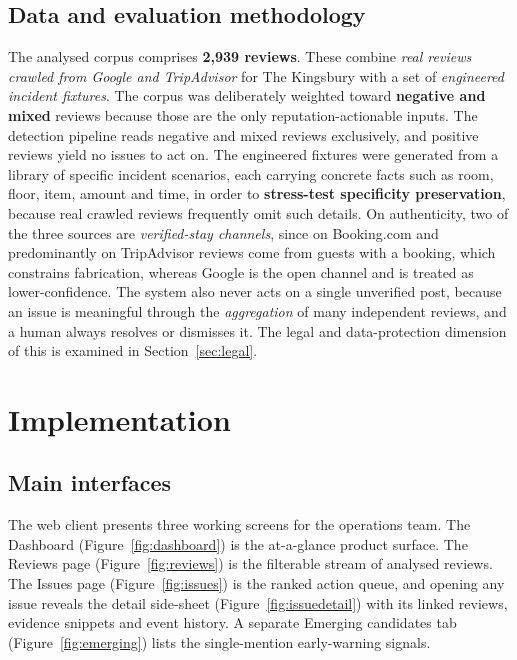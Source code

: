 \documentclass[11pt,a4paper]{article}
\begin{document}
\subsection{Data and evaluation methodology}
\label{sec:data}
The analysed corpus comprises \textbf{2{,}939 reviews}. These combine \emph{real reviews crawled from
Google and TripAdvisor} for The Kingsbury with a set of \emph{engineered incident fixtures}. The corpus
was deliberately weighted toward \textbf{negative and mixed} reviews because those are the only
reputation-actionable inputs. The detection pipeline reads negative and mixed reviews exclusively, and
positive reviews yield no issues to act on. The engineered fixtures were generated from a library of
specific incident scenarios, each carrying concrete facts such as room, floor, item, amount and time, in
order to \textbf{stress-test specificity preservation}, because real crawled reviews frequently omit
such details. On authenticity, two of the three sources are \emph{verified-stay channels}, since on
Booking.com and predominantly on TripAdvisor reviews come from guests with a booking, which constrains
fabrication, whereas Google is the open channel and is treated as lower-confidence. The system also
never acts on a single unverified post, because an issue is meaningful through the \emph{aggregation} of
many independent reviews, and a human always resolves or dismisses it. The legal and data-protection
dimension of this is examined in Section~\ref{sec:legal}.

\section{Implementation}
\label{sec:impl}

\subsection{Main interfaces}
The web client presents three working screens for the operations team. The Dashboard
(Figure~\ref{fig:dashboard}) is the at-a-glance product surface. The Reviews page
(Figure~\ref{fig:reviews}) is the filterable stream of analysed reviews. The Issues page
(Figure~\ref{fig:issues}) is the ranked action queue, and opening any issue reveals the detail
side-sheet (Figure~\ref{fig:issuedetail}) with its linked reviews, evidence snippets and event history.
A separate Emerging candidates tab (Figure~\ref{fig:emerging}) lists the single-mention early-warning
signals.
\end{document}
